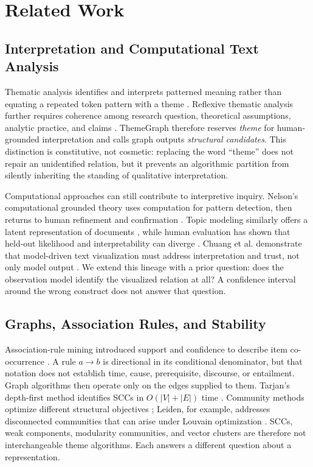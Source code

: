 \documentclass[manuscript,screen,review]{acmart}
\begin{document}
\section{Related Work}

\subsection{Interpretation and Computational Text Analysis}

Thematic analysis identifies and interprets patterned meaning rather than equating a repeated token pattern with a theme \cite{braun2006}. Reflexive thematic analysis further requires coherence among research question, theoretical assumptions, analytic practice, and claims \cite{braun2021}. ThemeGraph therefore reserves \emph{theme} for human-grounded interpretation and calls graph outputs \emph{structural candidates}. This distinction is constitutive, not cosmetic: replacing the word ``theme'' does not repair an unidentified relation, but it prevents an algorithmic partition from silently inheriting the standing of qualitative interpretation.

Computational approaches can still contribute to interpretive inquiry. Nelson's computational grounded theory uses computation for pattern detection, then returns to human refinement and confirmation \cite{nelson2020}. Topic modeling similarly offers a latent representation of documents \cite{blei2003}, while human evaluation has shown that held-out likelihood and interpretability can diverge \cite{chang2009}. Chuang et al. demonstrate that model-driven text visualization must address interpretation and trust, not only model output \cite{chuang2012}. We extend this lineage with a prior question: does the observation model identify the visualized relation at all? A confidence interval around the wrong construct does not answer that question.

\subsection{Graphs, Association Rules, and Stability}

Association-rule mining introduced support and confidence to describe item co-occurrence \cite{agrawal1993}. A rule $a\rightarrow b$ is directional in its conditional denominator, but that notation does not establish time, cause, prerequisite, discourse, or entailment. Graph algorithms then operate only on the edges supplied to them. Tarjan's depth-first method identifies SCCs in $O(|V|+|E|)$ time \cite{tarjan1972}. Community methods optimize different structural objectives \cite{newman2004}; Leiden, for example, addresses disconnected communities that can arise under Louvain optimization \cite{traag2019}. SCCs, weak components, modularity communities, and vector clusters are therefore not interchangeable theme algorithms. Each answers a different question about a representation.
\end{document}
